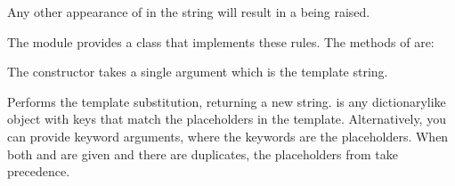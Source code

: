\documentclass[letterpaper,10pt,english]{sphinxmanual}
\begin{document}
Any other appearance of \sphinxcode{\sphinxupquote{\$}} in the string will result in a 
being raised.

The {\hyperref[\detokenize{string:module-string}]{}} module provides a {\hyperref[\detokenize{string:string.Template}]{}} class that implements
these rules.  The methods of {\hyperref[\detokenize{string:string.Template}]{}} are:

\vspace{5px}

\begin{fulllineitems}
\label{\detokenize{string:string.Template}}
The constructor takes a single argument which is the template string.

\vspace{5px}

\begin{fulllineitems}
\label{\detokenize{string:string.Template.substitute}}
Performs the template substitution, returning a new string.   is
any dictionary\sphinxhyphen{}like object with keys that match the placeholders in the
template.  Alternatively, you can provide keyword arguments, where the
keywords are the placeholders.  When both  and  are given
and there are duplicates, the placeholders from  take precedence.

\end{fulllineitems}



\end{fulllineitems}
\end{document}
